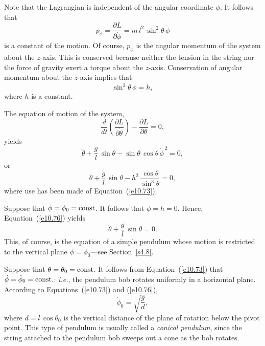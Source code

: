 Note that the Lagrangian is independent of the angular coordinate $\phi$. It
follows that
\begin{equation}
p_\phi = \frac{\partial L}{\partial \dot{\phi}} = m\,l^2\,\sin^2\theta\,\dot{\phi}
\end{equation}
is a constant of the motion. Of course, $p_\phi$ is the angular momentum of
the system about the $z$-axis. This is conserved because neither the tension
in the string nor the force of gravity exert a torque about the $z$-axis. 
Conservation of angular momentum about the $z$-axis implies that
\begin{equation}\label{e10.73}
\sin^2\theta\,\dot{\phi} = h,
\end{equation}
where $h$ is a constant.

The equation of motion of the system,
\begin{equation}
\frac{d}{dt}\!\left(\frac{\partial L}{\partial \dot{\theta}}\right) - \frac{\partial L}{\partial\theta} = 0,
\end{equation}
yields
\begin{equation}
\ddot{\theta} + \frac{g}{l}\,\sin\theta - \sin\theta\,\cos\theta\,\dot{\phi}^{\,2} = 0,
\end{equation}
or
\begin{equation}\label{e10.76}
\ddot{\theta} + \frac{g}{l}\,\sin\theta - h^2\,\frac{\cos\theta}{\sin^3\theta} = 0,
\end{equation}
where use has been made of Equation~(\ref{e10.73}).

Suppose that $\phi=\phi_0 = {\rm const}$. It follows that $\dot{\phi}=h=0$. Hence, Equation~(\ref{e10.76}) yields
\begin{equation}
\ddot{\theta} + \frac{g}{l}\,\sin\theta= 0.
\end{equation}
This, of course, is the equation of a simple pendulum whose motion is
restricted to the vertical plane $\phi = \phi_0$---see Section~\ref{s4.8}.

Suppose that $\theta=\theta_0 = {\rm const}$.  It follows from Equation~(\ref{e10.73}) that $\dot{\phi} = \dot{\phi}_0 = {\rm const}.$: {\em i.e.}, the pendulum bob rotates uniformly in a horizontal plane. According
to Equations~(\ref{e10.73}) and (\ref{e10.76}),
\begin{equation}
\dot{\phi}_0= \sqrt{\frac{g}{d}},
\end{equation}
where $d=l\,\cos\theta_0$ is the vertical distance of the plane of rotation below the pivot point. This type of pendulum is usually called a {\em conical
pendulum}, since the string attached to the pendulum bob sweeps out a
cone as the bob rotates. 

